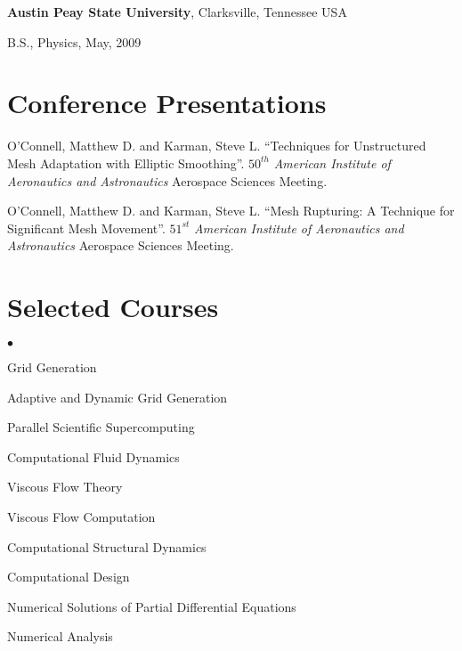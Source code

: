 \documentclass[margin,line]{res}
\newenvironment{list1}{
  \begin{list}{\ding{113}}{%
      \setlength{\itemsep}{0in}
      \setlength{\parsep}{0in} \setlength{\parskip}{0in}
      \setlength{\topsep}{0in} \setlength{\partopsep}{0in} 
      \setlength{\leftmargin}{0.17in}}}{\end{list}}
\newenvironment{list2}{
  \begin{list}{$\bullet$}{%
      \setlength{\itemsep}{0in}
      \setlength{\parsep}{0in} \setlength{\parskip}{0in}
      \setlength{\topsep}{0in} \setlength{\partopsep}{0in} 
      \setlength{\leftmargin}{0.2in}}}{\end{list}}
\begin{document}
\begin{resume}
{\bf Austin Peay State University}, Clarksville, Tennessee USA\\
\vspace*{-.1in}
\begin{list1}
\item[] B.S., Physics,  May, 2009
\end{list1}

\section{\sc Conference Presentations}

O'Connell, Matthew D. and Karman, Steve L. ``Techniques for Unstructured Mesh Adaptation with Elliptic Smoothing''.  $50^{th}$ {\em American Institute of Aeronautics and Astronautics} Aerospace Sciences Meeting.

O'Connell, Matthew D. and Karman, Steve L. ``Mesh Rupturing: A Technique for Significant Mesh Movement''. $51^{st}$ {\em American Institute of Aeronautics and Astronautics} Aerospace Sciences Meeting.


\section{\sc Selected Courses}
\begin{list2}
\item Grid Generation  
\item Adaptive and Dynamic Grid Generation 
\item Parallel Scientific Supercomputing
\item Computational Fluid Dynamics 
\item Viscous Flow Theory
\item Viscous Flow Computation
\item Computational Structural Dynamics 
\item Computational Design
\item Numerical Solutions of Partial Differential Equations
\item Numerical Analysis 
\end{list2}







\end{resume}
\end{document}

